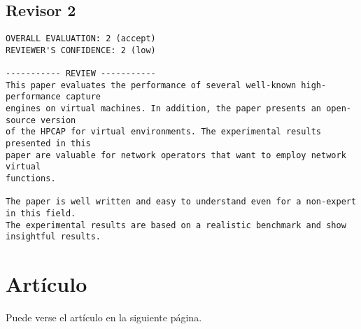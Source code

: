 \subsection{Revisor 2}
\begin{verbatim}
OVERALL EVALUATION: 2 (accept)
REVIEWER'S CONFIDENCE: 2 (low)

----------- REVIEW -----------
This paper evaluates the performance of several well-known high-performance capture
engines on virtual machines. In addition, the paper presents an open-source version
of the HPCAP for virtual environments. The experimental results presented in this
paper are valuable for network operators that want to employ network virtual
functions.

The paper is well written and easy to understand even for a non-expert in this field.
The experimental results are based on a realistic benchmark and show insightful results.
\end{verbatim}

\section{Artículo}
Puede verse el artículo en la siguiente página.

